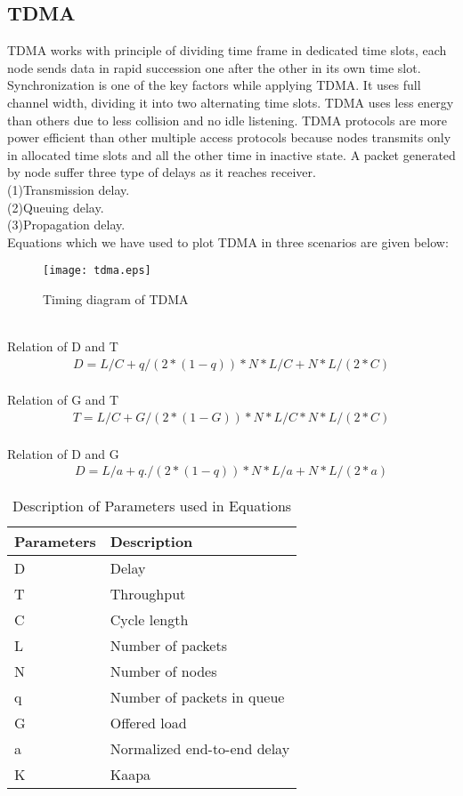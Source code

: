 \documentclass[10pt, conference, compsocconf]{IEEEtran}
\begin{document}
\subsection{TDMA}
TDMA works with principle of dividing time frame in dedicated time slots, each node sends data in rapid
succession one after the other in its own time slot. Synchronization is one of the key factors while applying TDMA. It uses full channel width, dividing it
into two alternating time slots. TDMA uses less energy than others due to less collision and no idle listening. TDMA protocols are more power efficient than other multiple access protocols because nodes transmits only in allocated time slots and all the other time in inactive state. A packet generated by node suffer three type of delays as it reaches receiver.
\\
{(1)}Transmission delay.
\\
{(2)}Queuing delay.
\\
{(3)}Propagation delay.
\\Equations which we have used to plot TDMA in three scenarios are given below:
\begin{figure}[!h]
\centering
\caption{Timing diagram of TDMA}
\texttt{[image: tdma.eps]}
\end{figure}
\\
Relation of D and T
\begin{eqnarray}
D=L/C+q/(2*(1-q))*N*L/C+N*L/(2*C)
\end{eqnarray}
\\
Relation of G and T
\begin{eqnarray}
T=L/C+G/(2*(1-G))*N*L/C*N*L/(2*C)
\end{eqnarray}
\\
Relation of D and G
\begin{eqnarray}
D=L/a+q./(2*(1-q))*N*L/a+N*L/(2*a)
\end{eqnarray}
\begin{table}
\caption{Description of Parameters used in Equations}
\begin{center}
    \begin{tabular}{ | p{2.5cm} | p{2.5cm} |}
    \hline
    Parameters & Description\\ \hline
    D & Delay\\ \hline
    T & Throughput\\ \hline
    C & Cycle length\\ \hline
    L & Number of packets\\ \hline
    N & Number of nodes\\ \hline
    q & Number of packets in queue\\ \hline
    G & Offered load\\ \hline
    a & Normalized end-to-end delay\\ \hline
    K & Kaapa\\ \hline
    \end{tabular}
\end{center}
\end{table}
\end{document}
